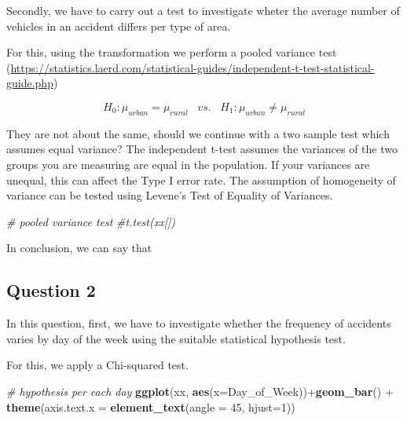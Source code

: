 \documentclass[]{article}
\newenvironment{Shaded}{\begin{snugshade}}{\end{snugshade}}
\newcommand{\KeywordTok}[1]{\textcolor[rgb]{0.13,0.29,0.53}{\textbf{{#1}}}}
\newcommand{\DataTypeTok}[1]{\textcolor[rgb]{0.13,0.29,0.53}{{#1}}}
\newcommand{\DecValTok}[1]{\textcolor[rgb]{0.00,0.00,0.81}{{#1}}}
\newcommand{\StringTok}[1]{\textcolor[rgb]{0.31,0.60,0.02}{{#1}}}
\newcommand{\CommentTok}[1]{\textcolor[rgb]{0.56,0.35,0.01}{\textit{{#1}}}}
\newcommand{\NormalTok}[1]{{#1}}
\begin{document}
Secondly, we have to carry out a test to investigate wheter the average
number of vehicles in an accident differs per type of area.

For this, using the transformation we perform a pooled variance test
(\url{https://statistics.laerd.com/statistical-guides/independent-t-test-statistical-guide.php})

\[H_{0}: \mu_{urban} = \mu_{rural}\;\;\;vs.\;\;\;H_{1}: \mu_{urban} \neq \mu_{rural}\]

They are not about the same, should we continue with a two sample test
which assumes equal variance? The independent t-test assumes the
variances of the two groups you are measuring are equal in the
population. If your variances are unequal, this can affect the Type I
error rate. The assumption of homogeneity of variance can be tested
using Levene's Test of Equality of Variances.

\begin{Shaded}
\begin{Highlighting}[]
\CommentTok{# pooled variance test}
\CommentTok{#t.test(xx[])}
\end{Highlighting}
\end{Shaded}

In conclusion, we can say that

\subsection{Question 2}\label{question-2}

In this question, first, we have to investigate whether the frequency of
accidents varies by day of the week using the suitable statistical
hypothesis test.

For this, we apply a Chi-squared test.

\begin{Shaded}
\begin{Highlighting}[]
\CommentTok{# hypothesis per each day}
\KeywordTok{ggplot}\NormalTok{(xx, }\KeywordTok{aes}\NormalTok{(}\DataTypeTok{x=}\NormalTok{Day_of_Week))+}\KeywordTok{geom_bar}\NormalTok{() +}
\StringTok{  }\KeywordTok{theme}\NormalTok{(}\DataTypeTok{axis.text.x =} \KeywordTok{element_text}\NormalTok{(}\DataTypeTok{angle =} \DecValTok{45}\NormalTok{, }\DataTypeTok{hjust=}\DecValTok{1}\NormalTok{))}
\end{Highlighting}
\end{Shaded}
\end{document}
